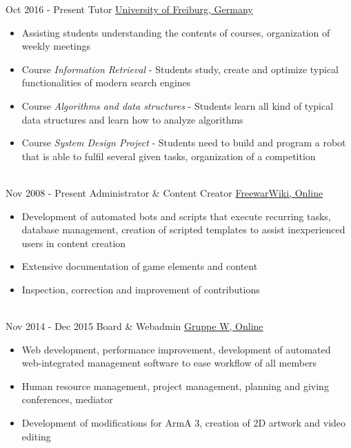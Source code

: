 \documentclass[letterpaper]{twentysecondcv} %
\begin{document}
\begin{twenty} %
     	\twentyitem
    		{Oct 2016 -}
		{Present}
        		{Tutor}
        		{\href{https://www.uni-freiburg.de/}{University of Freiburg, Germany}}
        		{}
        		{\begin{itemize}
        			\item Assisting students understanding the contents of courses, organization of weekly meetings
        			\item Course \textit{Information Retrieval} - Students study, create and optimize typical
        				functionalities of modern search engines
        			\item Course \textit{Algorithms and data structures} - Students learn all kind of typical data
        				structures and learn how to analyze algorithms
        			\item Course \textit{System Design Project} - Students need to build and program a robot that is
        				able to fulfil several given tasks, organization of a competition
        		\end{itemize}}\\
     	\twentyitem
    		{Nov 2008 -}
		{Present}
        		{Administrator \& Content Creator}
        		{\href{http://www.fwwiki.de/}{FreewarWiki, Online}}
        		{}
        		{\begin{itemize}
        			\item Development of automated bots and scripts that execute recurring tasks, database management,
        				creation of scripted templates to assist inexperienced users in content creation
        			\item Extensive documentation of game elements and content
        			\item Inspection, correction and improvement of contributions
        		\end{itemize}}\\
	\twentyitem
    		{Nov 2014 -}
		{Dec 2015}
        		{Board \& Webadmin}
        		{\href{https://www.gruppe-w.de/}{Gruppe W, Online}}
        		{}
        		{\begin{itemize}
        			\item Web development, performance improvement, development of automated web-integrated
        				management software to ease workflow of all members
			\item Human resource management, project management, planning and giving conferences, mediator
        			\item Development of modifications for ArmA 3, creation of 2D artwork and video editing

\end{itemize}}
\end{twenty}
\end{document}
